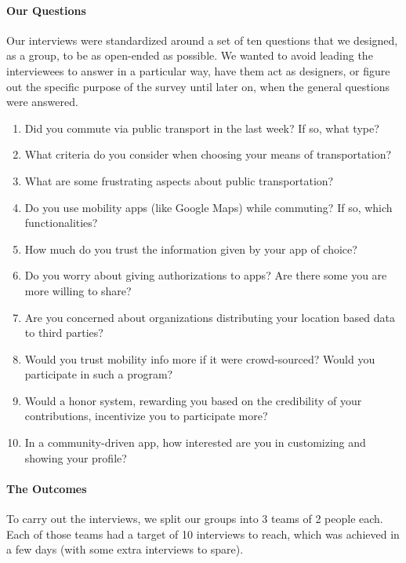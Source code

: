 \documentclass[a4paper, 11pt]{report}
\newenvironment{titlebox}[1][]{%
  \centering
  \basecolorbox[#1]%
}{%
  \endbasecolorbox%
}
\begin{document}
\paragraph{Our Questions}

Our interviews were standardized around a set of ten questions that we designed, as a group,
to be as open-ended as possible. We wanted to avoid leading the interviewees to answer in a
particular way, have them act as designers, or figure out the specific purpose of the
survey until later on, when the general questions were answered.\\[2pt]

\begin{titlebox}[The Questions:]
	\begin{enumerate}
		\item Did you commute via public transport in the last week? If so, what type?
		\item What criteria do you consider when choosing your means of transportation?
		\item What are some frustrating aspects about public transportation?
		\item Do you use mobility apps (like Google Maps) while commuting? If so, which
		      functionalities?
		\item How much do you trust the information given by your app of choice?
		\item Do you worry about giving authorizations to apps? Are there some you are more willing to share?
		\item Are you concerned about organizations distributing your location based data to third parties?
		\item Would you trust mobility info more if it were crowd-sourced? Would you participate
		      in such a program?
		\item Would a honor system, rewarding you based on the credibility of
		      your contributions, incentivize you to participate more?
		\item In a community-driven app, how interested are you in customizing and showing your
		      profile?
	\end{enumerate}
\end{titlebox}

\paragraph{The Outcomes}

To carry out the interviews, we split our groups into 3 teams of 2 people each. Each of those
teams had a target of 10 interviews to reach, which was achieved in a few days (with
some extra interviews to spare).
\end{document}

